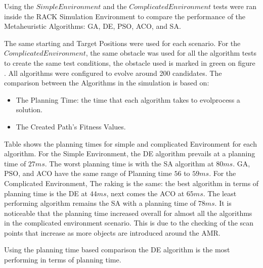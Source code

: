 Using the \(Simple Environment\) and the \(Complicated Environment\) tests were ran inside the 
RACK Simulation Environment to compare the performance of the Metaheuristic Algorithms: GA, DE, PSO,
ACO, and SA. 

The same starting and Target Positions were used for each scenario. For the \(Complicated Environment\),
the same obstacle was used for all the algorithm tests to create the same test conditions, the obstacle used is 
marked in green on figure . All algorithms were configured to evolve around 200 candidates.
The comparison between the Algorithms in the simulation is based on: 
\begin{itemize}
    \item The Planning Time: the time that each algorithm takes to evolprocess a solution.
    \item The Created Path's Fitness Values.
\end{itemize}

Table  shows the planning times for simple and complicated Environment 
for each algorithm. 
For the Simple Environment, the DE algorithm prevails at a planning time of \(27ms\).
The worst planning time is with the SA algorithm at \(80ms\). 
GA, PSO, and ACO have the same range of Planning time \(56\) to \(59ms\).
For the Complicated Environment, The raking is the same: the best algorithm in terms of planning time 
is the DE at \(44ms\), next comes the ACO at \(65ms\). The least performing algorithm remains the SA 
with a planning time of \(78ms\). It is noticeable that the planning time increased overall
for almost all the algorithms in the complicated environment scenario. 
This is due to the checking of the scan points that increase as more objects are introduced around the AMR.

Using the planning time based comparison the DE algorithm is the most performing in terms of planning time. 

